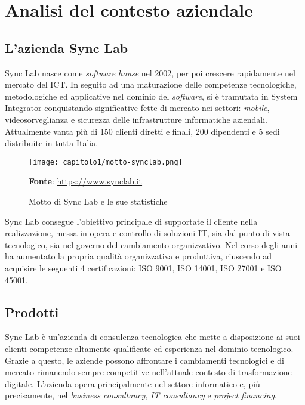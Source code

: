 
\chapter{Analisi del contesto aziendale}
\label{cap:contesto-aziendale}

\section{L'azienda Sync Lab}
Sync Lab nasce come \textit{software house} nel 2002, per poi crescere rapidamente nel mercato del \gls{ICT}. In seguito ad una maturazione delle competenze tecnologiche, metodologiche ed applicative nel dominio del \textit{software}, si è tramutata in \gls{System Integrator} conquistando significative fette di mercato nei settori: \textit{mobile}, videosorveglianza e sicurezza delle infrastrutture informatiche aziendali. Attualmente vanta più di 150 clienti diretti e finali, 200 dipendenti e 5 sedi distribuite in tutta Italia. 

\begin{figure}[!h]
  \centering
  \texttt{[image: capitolo1/motto-synclab.png]}
  \caption{Motto di Sync Lab e le sue statistiche}
  \textbf{Fonte}: \href{https://www.synclab.it}{https://www.synclab.it}
\end{figure}

Sync Lab consegue l'obiettivo principale di supportate il cliente nella realizzazione, messa in opera e controllo di soluzioni IT, sia dal punto di vista tecnologico, sia nel governo del cambiamento organizzativo. Nel corso degli anni ha aumentato la propria qualità organizzativa e produttiva, riuscendo ad acquisire le seguenti 4 certificazioni: ISO 9001, ISO 14001, ISO 27001 e ISO 45001.

\section{Prodotti}
Sync Lab è un'azienda di consulenza tecnologica che mette a disposizione ai suoi clienti competenze altamente qualificate ed esperienza nel dominio tecnologico. Grazie a questo, le aziende possono affrontare i cambiamenti tecnologici e di mercato rimanendo sempre competitive nell'attuale contesto di trasformazione digitale. L'azienda opera principalmente nel settore informatico e, più precisamente, nel \textit{business consultancy}, \textit{IT consultancy} e \textit{project financing}.

